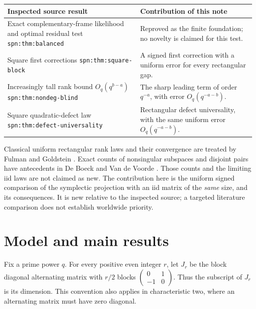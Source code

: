 \documentclass[11pt,letterpaper]{article}
\theoremstyle{remark}
\begin{document}
\begin{center}
\small
\begin{tabular}{p{}p{}}
\toprule
Inspected source result & Contribution of this note \\
\midrule
Exact complementary-frame likelihood and optimal residual test
\newline\texttt{spn:thm:balanced}
& Reproved as the finite foundation; no novelty is claimed for this test.\\[4pt]
Square first corrections
\newline\texttt{spn:thm:square-block}
& A signed first correction with a uniform error for every rectangular gap.\\[4pt]
Increasingly tall rank bound $O_q(q^{b-a})$
\newline\texttt{spn:thm:nondeg-blind}
& The sharp leading term of order $q^{-a}$, with error $O_q(q^{-a-b})$.\\[4pt]
Square quadratic-defect law
\newline\texttt{spn:thm:defect-universality}
& Rectangular defect universality, with the same uniform error $O_q(q^{-a-b})$.\\
\bottomrule
\end{tabular}
\end{center}

Classical uniform rectangular rank laws and their convergence are treated by
Fulman and Goldstein \cite{FulmanGoldstein}. Exact counts of nonsingular
subspaces and disjoint pairs have antecedents in De Boeck and Van de Voorde
\cite{DeBoeck}. Those counts and the limiting iid laws are not claimed as new.
The contribution here is the uniform signed comparison of the symplectic
projection with an iid matrix of the \emph{same} size, and its consequences.
It is new relative to the inspected source; a targeted literature comparison
does not establish worldwide priority.

\section{Model and main results}

Fix a prime power $q$. For every positive even integer $r$, let $J_r$ be the
block diagonal alternating matrix with $r/2$ blocks
$\left(\begin{smallmatrix}0&1\\-1&0\end{smallmatrix}\right)$.
Thus the subscript of $J_r$ is its dimension. This convention also applies in
characteristic two, where an alternating matrix must have zero diagonal.
\end{document}
